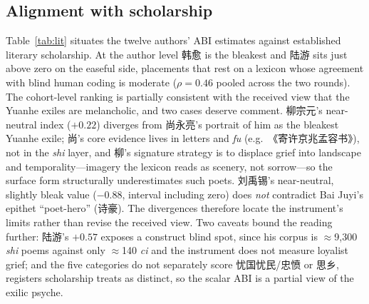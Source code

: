 \documentclass[10pt]{article}
\begin{document}
\subsection{Alignment with scholarship}
\label{sec:profiles:lit}
Table~\ref{tab:lit} situates the twelve authors' ABI estimates against established
literary scholarship. At the author level 韩愈 is the bleakest and 陆游 sits just above
zero on the easeful side, placements that rest on a lexicon whose agreement with blind
human coding is moderate ($\rho{=}0.46$ pooled across the two rounds). The cohort-level
ranking is partially consistent with the received view that the Yuanhe exiles are
melancholic, and two cases deserve comment. 柳宗元's near-neutral index ($+0.22$)
diverges from 尚永亮's portrait of him as the bleakest Yuanhe exile; 尚's core evidence
lives in letters and \emph{fu} (e.g.\ 《寄许京兆孟容书》), not in the \emph{shi} layer,
and 柳's signature strategy is to displace grief into landscape and temporality---imagery
the lexicon reads as scenery, not sorrow---so the surface form structurally
underestimates such poets. 刘禹锡's near-neutral, slightly bleak value ($-0.88$,
interval including zero) does \emph{not} contradict Bai Juyi's epithet ``poet-hero''
(诗豪). The divergences therefore locate the instrument's limits rather than revise the
received view. Two caveats bound the reading further: 陆游's $+0.57$ exposes a construct
blind spot, since his corpus is $\approx$9{,}300 \emph{shi} poems against only
$\approx$140 \emph{ci} and the instrument does not measure loyalist grief; and the five
categories do not separately score 忧国忧民/忠愤 or 思乡, registers scholarship treats as
distinct, so the scalar ABI is a partial view of the exilic psyche.
\end{document}

